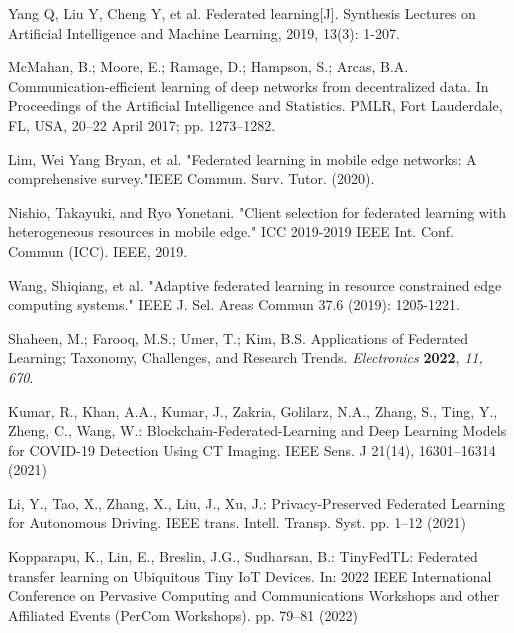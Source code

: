 \documentclass[twoside,twocolumn]{article}
\begin{document}
\begin{spacing}{1.0}
  
 \begin{thebibliography}{00}
  Yang Q, Liu Y, Cheng Y, et al. Federated learning[J]. Synthesis Lectures on Artificial Intelligence and Machine Learning, 2019, 13(3): 1-207.
 \vspace{-0.3cm}
 
 McMahan, B.; Moore, E.; Ramage, D.; Hampson, S.; Arcas, B.A. Communication-efficient learning of deep networks from decentralized data. In Proceedings of the Artificial Intelligence and Statistics. PMLR, Fort Lauderdale, FL, USA, 20–22 April 2017; pp. 1273–1282.
 \vspace{-0.3cm}
 
  Lim, Wei Yang Bryan, et al. "Federated learning in mobile edge networks: A comprehensive survey."IEEE Commun. Surv. Tutor. (2020).
 \vspace{-0.3cm}
 
    Nishio, Takayuki, and Ryo Yonetani. "Client selection for federated learning with heterogeneous resources in mobile edge." ICC 2019-2019 IEEE Int. Conf. Commun (ICC). IEEE, 2019.
 \vspace{-0.3cm}
 
    Wang, Shiqiang, et al. "Adaptive federated learning in resource constrained edge computing systems." IEEE J. Sel. Areas Commun 37.6 (2019): 1205-1221.
 \vspace{-0.3cm}
 
     Shaheen, M.; Farooq, M.S.; Umer, T.; Kim, B.S. Applications of Federated Learning; Taxonomy, Challenges, and Research Trends. \emph{Electronics} \textbf{2022}, \emph{11, 670}.
 \vspace{-0.3cm}
 
   Kumar, R., Khan, A.A., Kumar, J., Zakria, Golilarz, N.A., Zhang, S., Ting, Y., Zheng, C., Wang, W.: Blockchain-Federated-Learning and Deep Learning Models for COVID-19 Detection Using CT Imaging. IEEE Sens. J 21(14), 16301–16314 (2021)
 \vspace{-0.3cm}
 
   Li, Y., Tao, X., Zhang, X., Liu, J., Xu, J.: Privacy-Preserved Federated Learning for Autonomous Driving. IEEE trans. Intell. Transp. Syst. pp. 1–12 (2021)
 \vspace{-0.3cm}
 
   Kopparapu, K., Lin, E., Breslin, J.G., Sudharsan, B.: TinyFedTL: Federated transfer learning on Ubiquitous Tiny IoT Devices. In: 2022 IEEE International Conference on Pervasive Computing and Communications Workshops and other Affiliated Events (PerCom Workshops). pp. 79–81 (2022)
 \vspace{-0.3cm}
 

\end{thebibliography}
\end{spacing}
\end{document}
